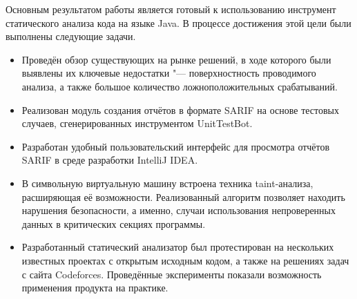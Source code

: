 
Основным результатом работы является готовый к использованию инструмент статического анализа кода на языке Java. В процессе достижения этой цели были выполнены следующие задачи.

\begin{itemize}
    \item Проведён обзор существующих на рынке решений, в ходе которого были выявлены их ключевые недостатки "--- поверхностность проводимого анализа, а также большое количество ложноположительных срабатываний.
    \item Реализован модуль создания отчётов в формате SARIF на основе тестовых случаев, сгенерированных инструментом UnitTestBot.
    \item Разработан удобный пользовательский интерфейс для просмотра отчётов SARIF в среде разработки IntelliJ IDEA.
    \item В символьную виртуальную машину встроена техника taint-анализа, расширяющая её возможности. Реализованный алгоритм позволяет находить нарушения безопасности, а именно, случаи использования непроверенных данных в критических секциях программы.
    \item Разработанный статический анализатор был протестирован на нескольких известных проектах с открытым исходным кодом, а также на решениях задач с сайта Codeforces. Проведённые эксперименты показали возможность применения продукта на практике.
\end{itemize}
